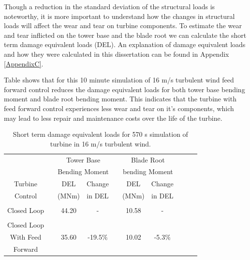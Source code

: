 Though a reduction in the standard deviation of the structural loads is noteworthy, it is more important to understand how the changes in structural loads will affect the wear and tear on turbine components. To estimate the wear and tear inflicted on the tower base and the blade root we can calculate the short term damage equivalent loads (DEL). An explanation of damage equivalent loads and how they were calculated in this dissertation can be found in Appendix \ref{AppendixC}. 

Table shows that for this 10 minute simulation of 16 m/s turbulent wind feed forward control reduces the damage equivalent loads for both tower base bending moment and blade root bending moment. This indicates that the turbine with feed forward control experiences less wear and tear on it's components, which may lead to less repair and maintenance costs over the life of the turbine.


\begin{table}
\centering
\begin{tabular}{ c | c c c c c c c c c}
\hline
\hline
					&&\multicolumn{2}{c}{Tower Base}					&&\multicolumn{2}{c}{Blade	Root} \\
					&&\multicolumn{2}{c}{Bending Moment}			&&\multicolumn{2}{c}{bending Moment}\\
						\cline{3-4} 														\cline{6-7}
Turbine			&& DEL   	& Change										&& DEL  	& Change\\
Control			&& (MNm)  & in DEL 										&& (MNm)  & in DEL 	\\
\hline
\\
Closed Loop  && 44.20 & - 													&& 10.58 & - \\
 \\
Closed Loop\\
With Feed  		&& 35.60 & -19.5$\%$ 									&& 10.02 & -5.3$\%$\\
Forward\\
\hline
\hline
\end{tabular}
\caption{Short term damage equivalent loads for 570 s simulation of turbine  in 16 m/s turbulent wind.}
\label{Table3-3}
\end{table}


